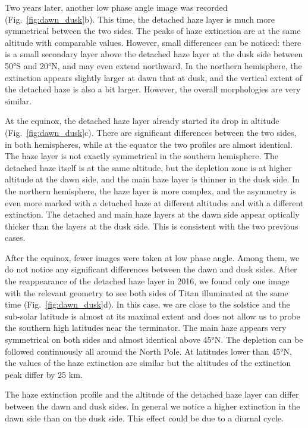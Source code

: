 Two years later, another low phase angle image was recorded (Fig.~\ref{fig:dawn_dusk}b).
This time, the detached haze layer is much more symmetrical between the two sides. The peaks of haze extinction
are at the same altitude with comparable values. However, small differences can be noticed: there is a
small secondary layer above the detached haze layer at the dusk side between \ang{50}S and \ang{20}N, and may even extend
northward. In the northern hemisphere, the extinction appears slightly larger at dawn that at dusk, and the
vertical extent of the detached haze is also a bit larger. However, the overall morphologies are very similar.

At the equinox, the detached haze layer already started its drop in altitude (Fig.~\ref{fig:dawn_dusk}c).
There are significant differences between the two sides, in both hemispheres, while at the equator the two
profiles are almost identical. The haze layer is not exactly symmetrical in the southern hemisphere. The detached
haze itself is at the same altitude, but the depletion zone is at higher altitude at the dawn side, and the main
haze layer is thinner in the dusk side. In the northern hemisphere, the haze layer is more complex, and the
asymmetry is even more marked with a detached haze at different altitudes and with a different extinction. The
detached and main haze layers at the dawn side appear optically thicker than the layers at the dusk side.
This is consistent with the two previous cases.

After the equinox, fewer images were taken at low phase angle. Among them, we do not notice any
significant differences between the dawn and dusk sides. After the reappearance of the detached haze layer in
2016, we found only one image with the relevant geometry to see both sides of Titan illuminated at the same time
(Fig.~\ref{fig:dawn_dusk}d). In this case, we are close to the solstice and the sub-solar latitude is almost
at its maximal extent and does not allow us to probe the southern high latitudes near the terminator.
The main haze appears very symmetrical on both sides and almost identical
above \ang{45}N. The depletion can be followed continuously all around the North Pole. At latitudes lower than
\ang{45}N, the values of the haze extinction are similar but the altitudes of the extinction peak differ by
25 km.

The haze extinction profile and the altitude of the detached haze layer can differ between the dawn
and dusk sides. In general we notice a higher extinction in the dawn side than on the dusk side. This effect
could be due to a diurnal cycle.
